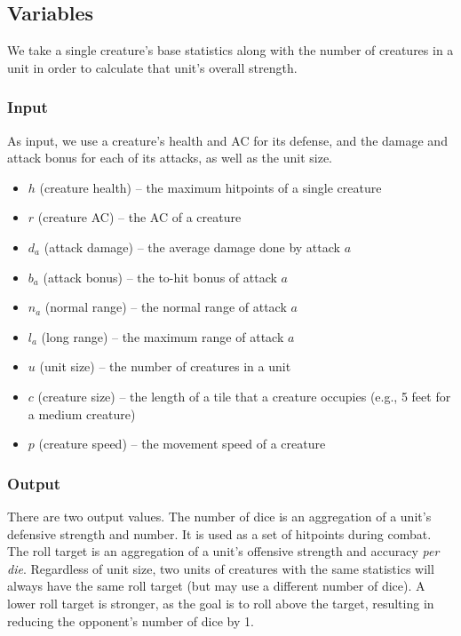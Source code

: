 \subsection{Variables}

We take a single creature's base statistics along with the number of creatures in a unit
in order to calculate that unit's overall strength.

\subsubsection{Input}

As input, we use a creature's health and AC for its defense,
and the damage and attack bonus for each of its attacks,
as well as the unit size.

\begin{itemize}
    \item $h$ (creature health) -- the maximum hitpoints of a single creature
    \item $r$ (creature AC) -- the AC of a creature
    \item $d_a$ (attack damage) -- the average damage done by attack $a$
    \item $b_a$ (attack bonus) -- the to-hit bonus of attack $a$
    \item $n_a$ (normal range) -- the normal range of attack $a$
    \item $l_a$ (long range) -- the maximum range of attack $a$
    \item $u$ (unit size) -- the number of creatures in a unit
    \item $c$ (creature size) -- the length of a tile that a creature occupies
        (e.g., 5 feet for a medium creature)
    \item $p$ (creature speed) -- the movement speed of a creature
\end{itemize}

\subsubsection{Output}

There are two output values.
The number of dice is an aggregation of a unit's defensive strength and number.
It is used as a set of hitpoints during combat.
The roll target is an aggregation
of a unit's offensive strength and accuracy \emph{per die}.
Regardless of unit size,
two units of creatures with the same statistics
will always have the same roll target
(but may use a different number of dice).
A lower roll target is stronger,
as the goal is to roll above the target,
resulting in reducing the opponent's number of dice by 1.

